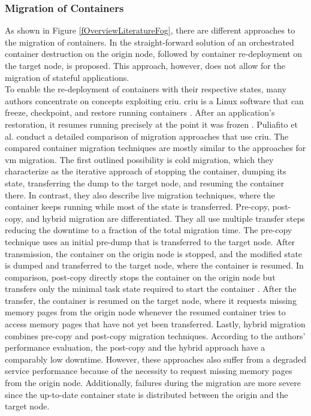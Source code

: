 \subsubsection{Migration of Containers}
\label{lMigrationContainer}
As shown in Figure \ref{fOverviewLiteratureFog}, there are different approaches to the migration of containers. In \cite{Dupont.2017} the straight-forward solution of an orchestrated container destruction on the origin node, followed by container re-deployment on the target node, is proposed. This approach, however, does not allow for the migration of stateful applications.\\
To enable the re-deployment of containers with their respective states, many authors concentrate on concepts exploiting \gls{criu}. \gls{criu} is a Linux software that can freeze, checkpoint, and restore running containers \cite{.29042020}. After an application's restoration, it resumes running precisely at the point it was frozen \cite{.29042020}. Puliafito et al. \cite{Puliafito.2019} conduct a detailed comparison of migration approaches that use \gls{criu}. The compared container migration techniques are mostly similar to the approaches for \gls{vm} migration. The first outlined possibility is cold migration, which they characterize as the iterative approach of stopping the container, dumping its state, transferring the dump to the target node, and resuming the container there. In contrast, they also describe live migration techniques, where the container keeps running while most of the state is transferred. Pre-copy, post-copy, and hybrid migration are differentiated. They all use multiple transfer steps reducing the downtime to a fraction of the total migration time. The pre-copy technique uses an initial pre-dump that is transferred to the target node. After transmission, the container on the origin node is stopped, and the modified state is dumped and transferred to the target node, where the container is resumed. In comparison, post-copy directly stops the container on the origin node but transfers only the minimal task state required to start the container \cite{.27112018}. After the transfer, the container is resumed on the target node, where it requests missing memory pages from the origin node whenever the resumed container tries to access memory pages that have not yet been transferred. Lastly, hybrid migration combines pre-copy and post-copy migration techniques. According to the authors' performance evaluation, the post-copy and the hybrid approach have a comparably low downtime. However, these approaches also suffer from a degraded service performance because of the necessity to request missing memory pages from the origin node. Additionally, failures during the migration are more severe since the up-to-date container state is distributed between the origin and the target node.\\
